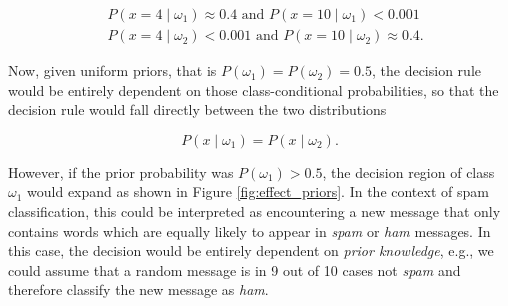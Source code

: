 \documentclass{article}
\begin{document}
\begin{equation} 
\begin{split}
&P(x=4 \mid \omega_1) \approx 0.4 \text{ and } P(x=10 \mid \omega_1) < 0.001\\
&P(x=4 \mid \omega_2) < 0.001 \text{ and } P(x=10 \mid \omega_2) \approx 0.4.
\end{split}
\end{equation} 


Now, given uniform priors, that is $P(\omega_1) = P(\omega_2) = 0.5$, the decision rule would be entirely dependent on those class-conditional probabilities, so that the decision rule would fall directly between the two distributions

\begin{equation}  P(x \mid \omega_1) = P(x \mid \omega_2).\end{equation}

However, if the prior probability was $P(\omega_1) > 0.5$, the decision region of class $\omega_1$ would expand as shown in Figure \ref{fig:effect_priors}. In the context of spam classification, this could be interpreted as encountering a new message that only contains words which are equally likely to appear in \emph{spam} or \emph{ham} messages. In this case, the decision would be entirely dependent on \emph{prior knowledge}, e.g., we could assume that a random message is in 9 out of 10 cases not \emph{spam} and therefore classify the new message as \emph{ham}.
\end{document}
